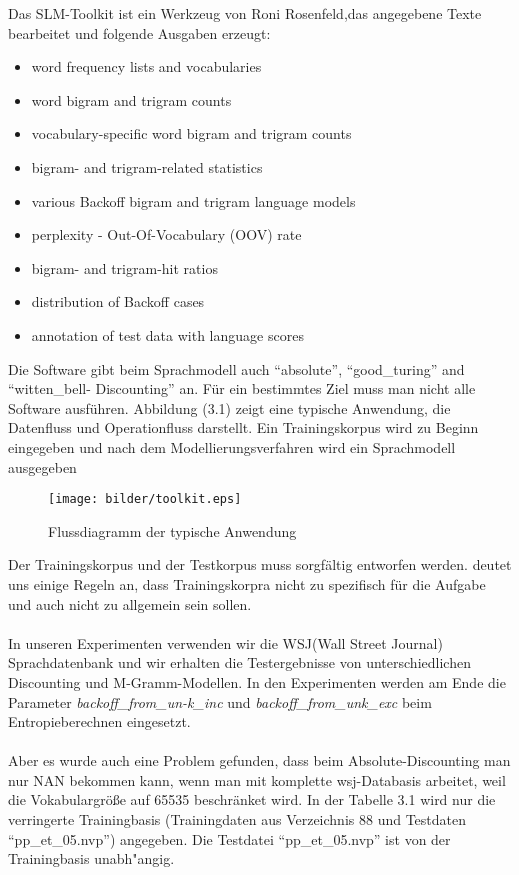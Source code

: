 Das SLM-Toolkit ist ein Werkzeug von Roni Rosenfeld,das angegebene Texte bearbeitet und folgende Ausgaben erzeugt\cite{int_slm_toolkit}:
\begin{itemize}
	\item word frequency lists and vocabularies
	\item word bigram and trigram counts
	\item vocabulary-specific word bigram and trigram counts
	\item bigram- and trigram-related statistics
	\item various Backoff bigram and trigram language models
	\item perplexity - Out-Of-Vocabulary (OOV) rate 
	\item bigram- and trigram-hit ratios
	\item distribution of Backoff cases 
	\item annotation of test data with language scores 
\end{itemize}
Die Software gibt beim Sprachmodell auch "`absolute"', "`good\_turing"' and "`witten\_bell- Discounting"' an.
F\"ur ein bestimmtes Ziel muss man nicht alle Software ausf\"uhren. Abbildung (3.1) zeigt eine typische Anwendung, die Datenfluss und Operationfluss darstellt.
Ein Trainingskorpus wird zu Beginn eingegeben und nach dem Modellierungsverfahren wird ein Sprachmodell ausgegeben
\begin{figure}[h]
	\centering
	\texttt{[image: bilder/toolkit.eps]}
	 \caption{Flussdiagramm der typische Anwendung}
  \label{fig:figure_2}
\end{figure}
Der Trainingskorpus und der Testkorpus muss sorgf\"altig entworfen werden. \cite{book_speech} deutet uns einige Regeln an, dass Trainingskorpra nicht zu spezifisch f\"ur die Aufgabe und auch nicht zu allgemein sein sollen.  
\\
\\
In unseren Experimenten verwenden wir die WSJ(Wall Street Journal) Sprachdatenbank und wir erhalten die Testergebnisse von unterschiedlichen Discounting und M-Gramm-Modellen. In den Experimenten werden am Ende die Parameter \emph{backoff\_from\_un-k\_inc} und \emph{backoff\_from\_unk\_exc} beim Entropieberechnen eingesetzt.
\\
\\  
Aber es wurde auch eine Problem gefunden, dass beim Absolute-Discounting man nur NAN bekommen kann, wenn man mit komplette wsj-Databasis arbeitet, weil die Vokabulargr\"o\ss e auf 65535 beschr\"anket wird. In der Tabelle 3.1 wird nur die verringerte Trainingbasis (Trainingdaten aus Verzeichnis 88 und Testdaten "`pp\_et\_05.nvp"') angegeben. Die Testdatei "`pp\_et\_05.nvp"' ist von der Trainingbasis unabh"angig.
